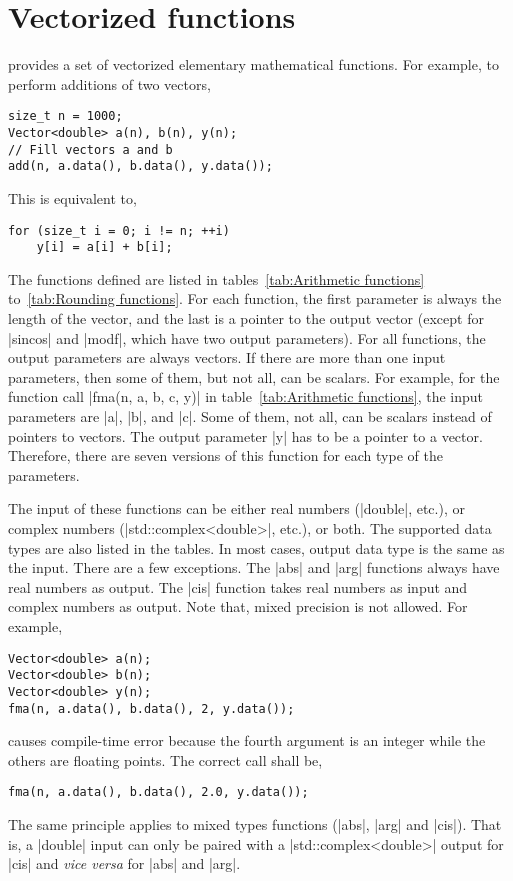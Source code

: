 \section{Vectorized functions}
\label{sec:Vectorized functions}

\mckl provides a set of vectorized elementary mathematical functions. For
example, to perform additions of two vectors,
\begin{verbatim}
size_t n = 1000;
Vector<double> a(n), b(n), y(n);
// Fill vectors a and b
add(n, a.data(), b.data(), y.data());
\end{verbatim}
This is equivalent to,
\begin{verbatim}
for (size_t i = 0; i != n; ++i)
    y[i] = a[i] + b[i];
\end{verbatim}
The functions defined are listed in tables~\ref{tab:Arithmetic functions}
to~\ref{tab:Rounding functions}. For each function, the first parameter is
always the length of the vector, and the last is a pointer to the output vector
(except for |sincos| and |modf|, which have two output parameters). For all
functions, the output parameters are always vectors. If there are more than one
input parameters, then some of them, but not all, can be scalars. For example,
for the function call |fma(n, a, b, c, y)| in table~\ref{tab:Arithmetic
functions}, the input parameters are |a|, |b|, and |c|. Some of them, not all,
can be scalars instead of pointers to vectors. The output parameter |y| has to
be a pointer to a vector. Therefore, there are seven versions of this function
for each type of the parameters.

The input of these functions  can be either real numbers (|double|, etc.), or
complex numbers (|std::complex<double>|, etc.), or both. The supported data
types are also listed in the tables. In most cases, output data type is the
same as the input. There are a few exceptions. The |abs| and |arg| functions
always have real numbers as output. The |cis| function takes real numbers as
input and complex numbers as output. Note that, mixed precision is not allowed.
For example,
\begin{verbatim}
Vector<double> a(n);
Vector<double> b(n);
Vector<double> y(n);
fma(n, a.data(), b.data(), 2, y.data());
\end{verbatim}
causes compile-time error because the fourth argument is an integer while the
others are floating points. The correct call shall be,
\begin{verbatim}
fma(n, a.data(), b.data(), 2.0, y.data());
\end{verbatim}
The same principle applies to mixed types functions (|abs|, |arg| and |cis|).
That is, a |double| input can only be paired with a |std::complex<double>|
output for |cis| and \emph{vice versa} for |abs| and |arg|.

